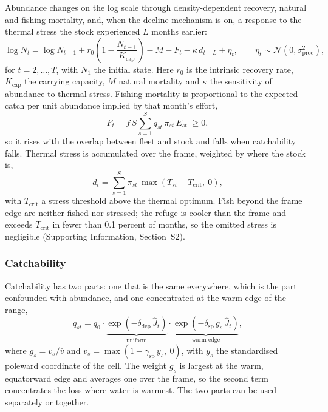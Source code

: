 \documentclass[11pt,a4paper]{article}
\newcommand{\vt}[1]{\text{#1}}
\begin{document}
Abundance changes on the log scale through density-dependent recovery, natural and fishing mortality, and, when the decline mechanism is on, a response to the thermal stress the stock experienced $L$ months earlier:
\begin{equation}
\log N_t = \log N_{t-1} + r_0\!\left(1-\frac{N_{t-1}}{K_{\vt{cap}}}\right) - M - F_t - \kappa\,d_{t-L} + \eta_t, \qquad \eta_t\sim\mathcal{N}(0,\sigma^2_{\vt{proc}}),
\label{eq:abund}
\end{equation}
for $t = 2,\dots,T$, with $N_1$ the initial state. Here $r_0$ is the intrinsic recovery rate, $K_{\vt{cap}}$ the carrying capacity, $M$ natural mortality and $\kappa$ the sensitivity of abundance to thermal stress. Fishing mortality is proportional to the expected catch per unit abundance implied by that month's effort,
\begin{equation}
F_t = f\,S\sum_{s=1}^{S} q_{st}\,\pi_{st}\,E_{st} \;\ge 0,
\label{eq:F}
\end{equation}
so it rises with the overlap between fleet and stock and falls when catchability falls. Thermal stress is accumulated over the frame, weighted by where the stock is,
\begin{equation}
d_t = \sum_{s=1}^{S}\pi_{st}\,\max(T_{st}-T_{\vt{crit}},\ 0),
\label{eq:dose}
\end{equation}
with $T_{\vt{crit}}$ a stress threshold above the thermal optimum. Fish beyond the frame edge are neither fished nor stressed; the refuge is cooler than the frame and exceeds $T_{\vt{crit}}$ in fewer than 0.1 percent of months, so the omitted stress is negligible (Supporting Information, Section~S2).

\subsubsection{Catchability}

Catchability has two parts: one that is the same everywhere, which is the part confounded with abundance, and one concentrated at the warm edge of the range,
\begin{equation}
q_{st} = q_0 \cdot \underbrace{\exp\!\left(-\delta_{\vt{dep}}\,\hat J_t\right)}_{\vt{uniform}} \cdot \underbrace{\exp\!\left(-\delta_{\vt{sp}}\,g_s\,\hat J_t\right)}_{\vt{warm edge}},
\label{eq:q}
\end{equation}
where $g_s = v_s/\bar v$ and $v_s = \max(1-\gamma_{\vt{sp}}\,y_s,\ 0)$, with $y_s$ the standardised poleward coordinate of the cell. The weight $g_s$ is largest at the warm, equatorward edge and averages one over the frame, so the second term concentrates the loss where water is warmest. The two parts can be used separately or together.
\end{document}
